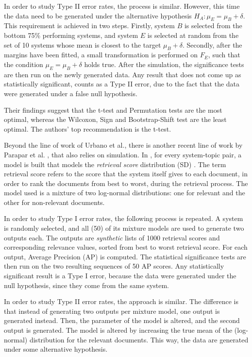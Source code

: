 In order to study Type II error rates, the process is similar. However, this time the data need to be generated under the alternative hypothesis $H_A: μ_E = μ_B + \delta$. This requirement is achieved in two steps. Firstly, system $B$ is selected from the bottom 75\% performing systems, and system $E$ is selected at random from the set of 10 systems whose mean is closest to the target $μ_B + \delta$. Secondly, after the margins have been fitted, a small transformation is performed on $F_E$, such that the condition $μ_E = μ_B + \delta$ holds true. After the simulation, the significance tests are then run on the newly generated data. Any result that does not come up as statistically significant, counts as a Type II error, due to the fact that the data were generated under a false null hypothesis.

Their findings suggest that the t-test and Permutation tests are the most optimal, whereas the Wilcoxon, Sign and Bootstrap-Shift test are the least optimal. The authors' top recommendation is the t-test.

Beyond the line of work of Urbano et al., there is another recent line of work by Parapar et al. \cite{Parapar2020, Parapar2021}, that also relies on simulation. In \cite{Parapar2020}, for every system-topic pair, a model is built that models the \textit{retrieval score} distribution (SD) \cite{Manmatha2001}. The term retrieval score refers to the score that the system itself gives to each document, in order to rank the documents from best to worst, during the retrieval process. The model used is a mixture of two log-normal distributions: one for relevant and the other for non-relevant documents. 

In order to study Type I error rates, the following process is repeated. A system is randomly selected, and all (50) of its mixture models are used to generate two outputs each. The outputs are \textit{synthetic} lists of 1000 retrieval scores and corresponding relevance values, sorted from best to worst retrieval score. For each output, Average Precision (AP) is computed. The statistical significance tests are then run on the two resulting sequences of 50 AP scores. Any statistically significant result is a Type I error, because the data were generated under the null hypothesis, since they come from the same system. 

In order to study Type II error rates, the approach is similar. The difference is that instead of generating two outputs per mixture model, one output is generated instead. Then, the parameter of the model is altered, and the second output is generated. The model is altered by increasing the true mean of the (log-normal) distribution for the relevant documents. This way, the data are generated under some alternative hypothesis.

